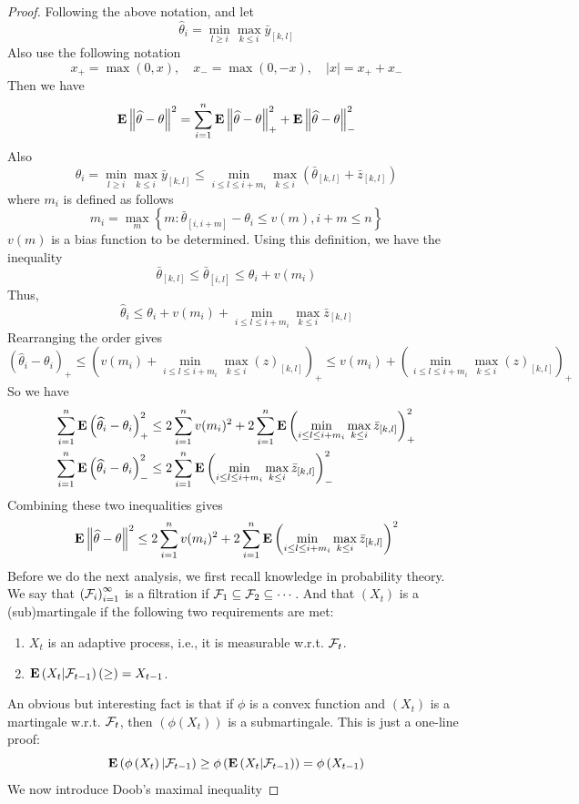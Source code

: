 \documentclass[12pt]{article}
\newcommand{\E}{{\bf E}}
\newcommand{\calF}{{\cal F}}
\newcommand{\bra}[1]{\left(#1\right)}
\newcommand{\bgbra}[1]{\left\{#1\right\}}
\newcommand{\abs}[1]{\left|#1\right|}
\newcommand{\norm}[1]{\left\|#1\right\|}
\newcommand{\wh}[1]{\widehat{#1}}
\def\beq{\begin{equation}}
\def\eeq{\end{equation}}
\def\beqal{\begin{equation}\begin{aligned}}
\def\eeqal{\end{aligned}\end{equation}}
\begin{document}
\begin{proof}
Following the above notation, and let
\beq
\wh{\theta}_i=\min_{l\geq i}\max_{k\leq i} \bar{y}_{[k,l]}
\eeq
Also use the following notation
\[
x_+=\max(0, x),\quad x_-=\max(0, -x),\quad \abs{x}=x_++x_-
\]
Then we have
\[
\E\norm{\wh{\theta}-\theta}^2=\sum_{i=1}^n\E\norm{\wh{\theta}-\theta}_+^2+\E\norm{\wh{\theta}-\theta}_-^2
\]
Also
\[
\wh{\theta}_i=\min_{l\geq i}\max_{k\leq i} \bar{y}_{[k,l]}\leq \min_{i\leq l\leq i+m_i}\max_{k\leq i} \bra{\bar{\theta}_{[k,l]}+\bar{z}_{[k,l]}}
\]
where $m_i$ is defined as follows
\[
m_i=\max_m\bgbra{m:\bar{\theta}_{[i,i+m]}-\theta_i\leq v(m),i+m\leq n}
\]
$v(m)$ is a bias function to be determined. Using this definition, we have the inequality
\[
\bar{\theta}_{[k,l]}\leq \bar{\theta}_{[i,l]}\leq \theta_i+v(m_i)
\]
Thus,
\[
\wh{\theta}_i\leq \theta_i+v(m_i)+\min_{i\leq l\leq i+m_i}\max_{k\leq i}\bar{z}_{[k,l]}
\]
Rearranging the order gives
\[
\bra{\wh{\theta}_i-\theta_i}_+\leq \bra{v(m_i)+\min_{i\leq l\leq i+m_i}\max_{k\leq i}\bra{z}_{[k,l]}}_+\leq v(m_i)+\bra{\min_{i\leq l\leq i+m_i}\max_{k\leq i}\bra{z}_{[k,l]}}_+
\]
So we have
\beqal
\sum_{i=1}^n\E\bra{\wh{\theta}_i-\theta_i}_+^2&\leq 2\sum_{i=1}^n v(m_i)^2+2\sum_{i=1}^n \E\bra{\min_{i\leq l\leq i+m_i}\max_{k\leq i} \bar{z}_{[k,l]} }_+^2\\
\sum_{i=1}^n\E\bra{\wh{\theta}_i-\theta_i}_-^2&\leq 2\sum_{i=1}^n \E\bra{\min_{i\leq l\leq i+m_i}\max_{k\leq i} \bar{z}_{[k,l]} }_-^2\\
\eeqal
Combining these two inequalities gives
\[
\E\norm{\wh{\theta}-\theta}^2\leq 2\sum_{i=1}^n v(m_i)^2+2\sum_{i=1}^n \E\bra{\min_{i\leq l\leq i+m_i}\max_{k\leq i} \bar{z}_{[k,l]} }^2
\]
Before we do the next analysis, we first recall knowledge in probability theory. We say that $\bra{\calF_i}_{i=1}^\infty$ is a filtration if $\calF_1\subseteq\calF_2\subseteq\cdots$. And that $\bra{X_t}$ is a (sub)martingale if the following two requirements are met:
\begin{enumerate}
\item $X_t$ is an adaptive process, i.e., it is measurable w.r.t. $\calF_t$.
\item $\E\bra{X_t|\calF_{t-1}} (\geq)=X_{t-1} $.
\end{enumerate}
An obvious but interesting fact is that if $\phi$ is a convex function and $\bra{X_t}$ is a martingale w.r.t. $\calF_t$, then $\bra{\phi(X_t)}$ is a submartingale. This is just a one-line proof:
\[
\E\bra{\phi\bra{X_t}|\calF_{t-1}}\geq \phi\bra{\E\bra{X_t|\calF_{t-1}}}=\phi\bra{X_{t-1}}
\]
We now introduce Doob's maximal inequality

\end{proof}
\end{document}
